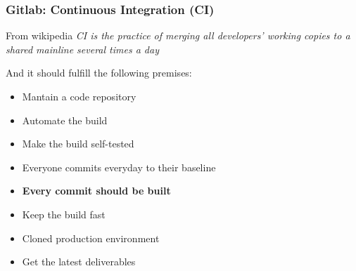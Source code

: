 \begin{frame}

\frametitle{Gitlab: Continuous Integration (CI)}

\begin{block}{From wikipedia}
\textit{CI is the practice of merging all developers' working copies to a shared mainline several times a day}
\end{block}

And it should fulfill the following premises:

\begin{itemize}[<+->]

\item Mantain a code repository
\item Automate the build
\item Make the build self-tested
\item Everyone commits everyday to their baseline
\item \textbf{Every commit should be built}
\item Keep the build fast
\item Cloned production environment
\item Get the latest deliverables

\end{itemize}
\end{frame}